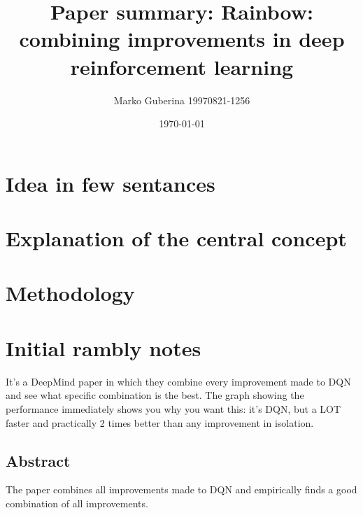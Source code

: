 \documentclass{article}
\title{Paper summary: Rainbow: combining improvements in deep reinforcement learning}
\date{\today}
\author{Marko Guberina 19970821-1256}
\begin{document}
\maketitle


\section{Idea in few sentances}




\section{Explanation of the central concept}




\section{Methodology}


\section{Initial rambly notes}
It's a DeepMind paper in which they combine every improvement made to DQN
and see what specific combination is the best.
The graph showing the performance immediately shows you why you want this:
it's DQN, but a LOT faster and practically 2 times better than any improvement 
in isolation.

\subsection{Abstract}
The paper combines all improvements made to DQN
and empirically finds a good combination of all improvements.
\end{document}
